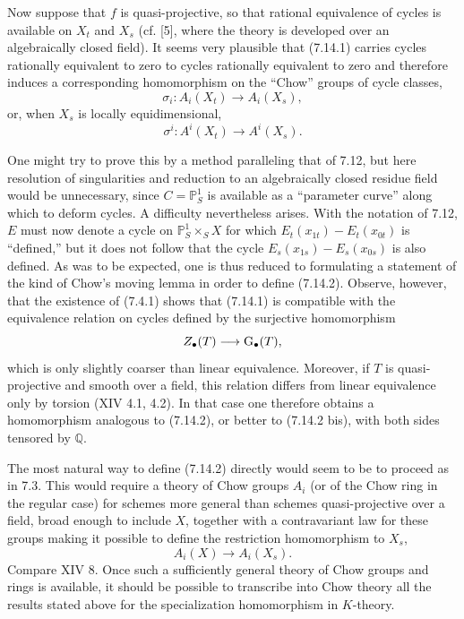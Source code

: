 Now suppose that $f$ is quasi-projective, so that rational equivalence of
cycles is available on $X_t$ and $X_s$ (cf. [5], where the theory is
developed over an algebraically closed field). It seems very plausible that
(7.14.1) carries cycles rationally equivalent to zero to cycles rationally
equivalent to zero and therefore induces a corresponding homomorphism on the
``Chow'' groups of cycle classes,
\begin{equation}\tag{7.14.2}
\sigma_i:A_i(X_t)\longrightarrow A_i(X_s),
\end{equation}
or, when $X_s$ is locally equidimensional,
\begin{equation}\tag{7.14.2 bis}
\sigma^i:A^i(X_t)\longrightarrow A^i(X_s).
\end{equation}

One might try to prove this by a method paralleling that of 7.12, but here
resolution of singularities and reduction
to an algebraically closed residue field would be unnecessary, since
$C=\mathbb P^1_S$ is available as a
``parameter curve'' along which to deform cycles. A difficulty nevertheless
arises. With the notation of 7.12, $E$ must now denote a cycle on
$\mathbb P^1_S\times_SX$ for which
$E_t(x_{1t})-E_t(x_{0t})$ is ``defined,'' but it does not follow that the
cycle $E_s(x_{1s})-E_s(x_{0s})$ is also defined. As was to be expected, one
is thus reduced to formulating a statement of the kind of Chow's moving
lemma in order to define (7.14.2).
Observe, however, that the existence of (7.4.1) shows that (7.14.1) is
compatible with the equivalence relation on cycles defined by the surjective
homomorphism
\[
Z_\bullet(T)\longrightarrow\operatorname{G}_\bullet(T),
\]
which is only slightly coarser than linear equivalence. Moreover, if $T$ is
quasi-projective and smooth over a field, this relation differs from linear
equivalence only by torsion (XIV 4.1, 4.2). In that case one therefore obtains
a homomorphism analogous to (7.14.2), or better to (7.14.2 bis), with both
sides tensored by $\mathbb Q$.

The most natural way to define (7.14.2) directly would seem to be to proceed
as in 7.3. This would require a theory of Chow groups $A_i$ (or of the Chow
ring in the regular case) for schemes more general than schemes
quasi-projective over a field, broad enough to include $X$, together with a
contravariant law for these groups making it possible to define the
restriction homomorphism to $X_s$,
\[
A_i(X)\longrightarrow A_i(X_s).
\]
Compare XIV 8. Once such a sufficiently general theory of Chow groups and
rings is available, it should be possible to transcribe into Chow theory all
the results stated above for the specialization homomorphism in $K$-theory.

